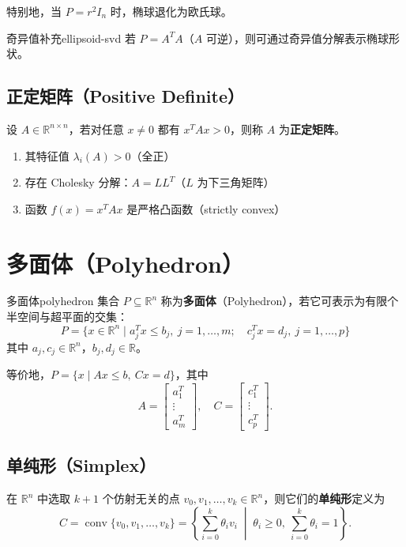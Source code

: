 \documentclass[11pt,a4paper]{article}
\begin{document}
特别地，当 $P = r^2 I_n$ 时，椭球退化为欧氏球。

\begin{remark}{奇异值补充}{ellipsoid-svd}
若 $P = A^T A$（$A$ 可逆），则可通过奇异值分解表示椭球形状。
\end{remark}

\subsection{正定矩阵（Positive Definite）}
设 $A \in \mathbb{R}^{n \times n}$，若对任意 $x \neq 0$ 都有 $x^T A x > 0$，则称 $A$ 为\textbf{正定矩阵}。

\begin{enumerate}
\item 其特征值 $\lambda_i(A) > 0$（全正）
\item 存在 Cholesky 分解：$A = LL^T$（$L$ 为下三角矩阵）
\item 函数 $f(x) = x^T A x$ 是严格凸函数（strictly convex）
\end{enumerate}

\section{多面体（Polyhedron）}

\begin{definition}{多面体}{polyhedron}
集合 $P \subseteq \mathbb{R}^n$ 称为\textbf{多面体}（Polyhedron），若它可表示为有限个半空间与超平面的交集：
\[
P = \{ x \in \mathbb{R}^n \mid a_j^T x \leq b_j,\ j=1,\dots,m;\quad c_j^T x = d_j,\ j=1,\dots,p \}
\]
其中 $a_j, c_j \in \mathbb{R}^n$，$b_j, d_j \in \mathbb{R}$。
\end{definition}

等价地，$P = \{ x \mid Ax \leq b,\ Cx = d \}$，其中
\[
A = \begin{bmatrix} a_1^T \\ \vdots \\ a_m^T \end{bmatrix},\quad
C = \begin{bmatrix} c_1^T \\ \vdots \\ c_p^T \end{bmatrix}.
\]

\subsection{单纯形（Simplex）}
在 $\mathbb{R}^n$ 中选取 $k+1$ 个仿射无关的点 $v_0, v_1, \dots, v_k \in \mathbb{R}^n$，则它们的\textbf{单纯形}定义为
\[
C = \operatorname{conv}\{v_0, v_1, \dots, v_k\} = \left\{ \sum_{i=0}^k \theta_i v_i \;\middle|\; \theta_i \geq 0,\ \sum_{i=0}^k \theta_i = 1 \right\}.
\]
\end{document}
